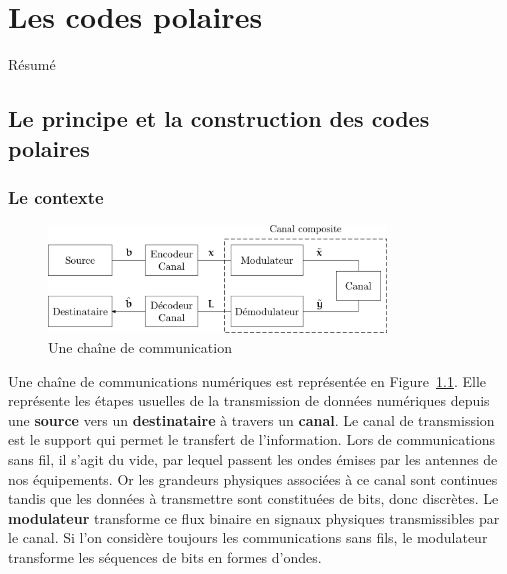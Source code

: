 
\chapter{Les codes polaires}

Résumé

\vspace*{\fill}
\minitocTITI
\vspace*{\fill}


\section{Le principe et la construction des codes polaires}

\subsection{Le contexte}
\label{subsec:contexte}


\begin{figure}[t]
\centering
\includegraphics[width=0.8\textwidth]{main/ch1_fig/chaine_com}
\caption{Une chaîne de communication}
\label{fig:chaine_com}
\end{figure}
Une chaîne de communications numériques est représentée en Figure~\ref{fig:chaine_com}.
Elle représente les étapes usuelles de la transmission de données numériques depuis une \textbf{source} vers un \textbf{destinataire} à travers un \textbf{canal}.
Le canal de transmission est le support qui permet le transfert de l'information. Lors de communications sans fil, il s'agit du vide, par lequel passent les ondes émises par les antennes de nos équipements. Or les grandeurs physiques associées à ce canal sont continues tandis que les données à transmettre sont constituées de bits, donc discrètes. Le \textbf{modulateur} transforme ce flux binaire en signaux physiques transmissibles par le canal. Si l'on considère toujours les communications sans fils, le modulateur transforme les séquences de bits en formes d'ondes.

